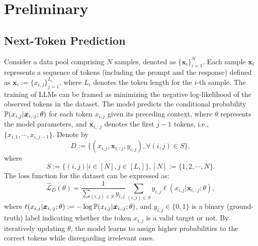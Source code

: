 
\section{Preliminary}\label{sec:preliminary}



\subsection{Next-Token Prediction}
Consider a data pool comprising $N$ samples, denoted as $\{\bm x_i\}_{i=1}^{N}$. Each sample $\bm x_i$ represents a sequence of tokens (including the prompt and the response) defined as $\bm x_i := \{x_{i,j}\}_{j=1}^{L_i}$, where $L_i$ denotes the token length for the $i$-th sample.
The training of LLMs can be framed as minimizing the negative log-likelihood of the observed tokens in the dataset. The model predicts the conditional probability $\mathbb P(x_{i,j} | \bm x_{i, :j}; \theta)$ for each token $x_{i,j}$ given its preceding context, where $\theta$ represents the model parameters, and $\bm x_{i, :j}$ denotes the first $j-1$ tokens, i.e., $\{x_{i, 1},\cdots,x_{i,j-1}\}$.
Denote by $$D:=\{(x_{i,j}, \bm x_{i,:j}, y_{i,j}), \forall (i,j)\in S\},$$ where $$S:=\{(i,j) | i\in [N], j\in [L_i]\}, [N]:=\{1, 2,\cdots, N\}.$$
The loss function for the dataset can be expressed as:
\begin{equation}\label{eq:loss}
    \widehat {\mathcal{L}}_D(\theta) =  \frac{1}{\sum_{(i,j)\in S}  y_{i,j}} \sum_{(i,j)\in S} y_{i,j} \ell(x_{i,j} | \bm x_{i,:j}; \theta),
\end{equation}
where $\ell(x_{i,j} | \bm x_{i,:j}; \theta):=-\log \mathbb P(x_{i,j} | \bm x_{i,:j}; \theta)$, and $y_{i,j}\in\{0,1\}$ is a binary (ground-truth) label indicating whether the token $x_{i,j}$ is a valid target or not. 
By iteratively updating $\theta$, the model learns to assign higher probabilities to the correct tokens while disregarding irrelevant ones.


